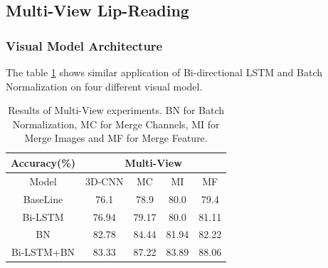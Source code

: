 \subsection{Multi-View Lip-Reading}
\subsubsection{Visual Model Architecture}
The table \ref{tab:multitb} shows similar application of Bi-directional LSTM and Batch Normalization on four different visual model. 
\begin{table}[h]
\centering
    \begin{tabular}{c|cccc}
        \multicolumn{1}{c|}{Accuracy(\%)} &%
        \multicolumn{4}{c}{Multi-View}\\ \hline
        Model&%
        3D-CNN & MC & MI & MF \\\hline
        BaseLine%
        & %
        76.1 & 78.9& 80.0& 79.4\\
        Bi-LSTM%
        & %
        76.94 & 79.17& 80.0& 81.11\\
        BN%
        & %
         82.78& 84.44& 81.94& 82.22\\
        Bi-LSTM+BN%
        & %
         83.33& 87.22& 83.89& 88.06\\
    \end{tabular}
    \caption{Results of Multi-View experiments. BN for Batch Normalization, MC for Merge Channels, MI for Merge Images and MF for Merge Feature.}
    \label{tab:multitb}
\end{table}


